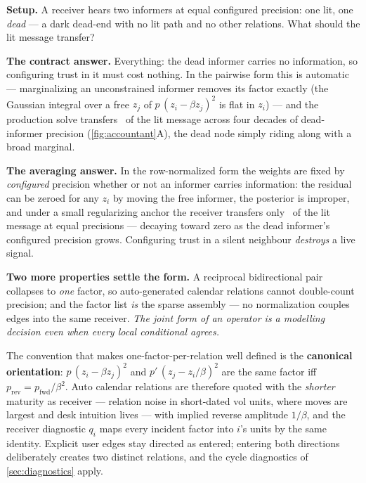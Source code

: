\documentclass[11pt]{article}
\begin{document}
\begin{example}[title={Case file: the dead informer}]
\textbf{Setup.}  A receiver hears two informers at equal configured
precision: one lit, one \emph{dead} --- a dark dead-end with no lit
path and no other relations.  What should the lit message transfer?

\textbf{The contract answer.}  Everything: the dead informer carries no
information, so configuring trust in it must cost nothing.  In the
pairwise form this is automatic --- marginalizing an unconstrained
informer removes its factor exactly (the Gaussian integral over a free
$z_j$ of $p\,(z_i-\beta z_j)^2$ is flat in $z_i$) --- and the
production solve transfers \gmpairflat\ of the lit message across four
decades of dead-informer precision (\cref{fig:accountant}A), the dead
node simply riding along with a broad marginal.

\textbf{The averaging answer.}  In the row-normalized form the
weights are fixed by \emph{configured} precision whether or not an
informer carries information: the residual can be zeroed for any $z_i$
by moving the free informer, the posterior is improper, and under a
small regularizing anchor the receiver transfers only \gmdeadhalf\ of
the lit message at equal precisions --- decaying toward zero as the
dead informer's configured precision grows.  Configuring trust in a
silent neighbour \emph{destroys} a live signal.

\textbf{Two more properties settle the form.}  A reciprocal
bidirectional pair collapses to \emph{one} factor, so auto-generated
calendar relations cannot double-count precision; and the factor list
\emph{is} the sparse assembly --- no normalization couples edges into
the same receiver.  \emph{The joint form of an operator is a modelling
decision even when every local conditional agrees.}
\end{example}

The convention that makes one-factor-per-relation well defined is the
\textbf{canonical orientation}: $p\,(z_i-\beta z_j)^2$ and
$p'\,(z_j-z_i/\beta)^2$ are the same factor iff
$p_{\mathrm{rev}}=p_{\mathrm{fwd}}/\beta^2$.  Auto calendar relations
are therefore quoted with the \emph{shorter} maturity as receiver ---
relation noise in short-dated vol units, where moves are largest and
desk intuition lives --- with implied reverse amplitude $1/\beta$, and
the receiver diagnostic $q_i$ maps every incident factor into $i$'s
units by the same identity.  Explicit user edges stay directed as
entered; entering both directions deliberately creates two distinct
relations, and the cycle diagnostics of \cref{sec:diagnostics} apply.
\end{document}
